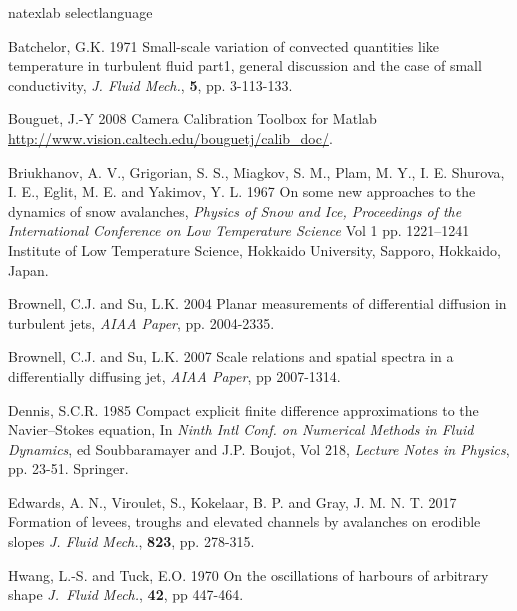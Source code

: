 \documentclass[lineno]{jfm}
\begin{document}
\begin{thebibliography}{99}

\expandafter\ifx\csname natexlab\endcsname\relax
\def\natexlab#1{#1}\fi
\expandafter\ifx\csname selectlanguage\endcsname\relax
\def\selectlanguage#1{\relax}\fi

{\sc Batchelor, G.K.} 1971 {Small-scale variation of convected quantities like temperature in turbulent fluid part1, general discussion and the case of small conductivity}, {\it J. Fluid Mech.}, {\bf 5}, pp. 3-113-133.

{\sc Bouguet, J.-Y} 2008 Camera Calibration Toolbox for Matlab {\url{http://www.vision.caltech.edu/bouguetj/calib_doc/}}.

{\sc Briukhanov, A. V.,   Grigorian, S. S., Miagkov,  S. M., Plam, M. Y.,   I. E. Shurova, I. E.,   Eglit, M. E. and Yakimov, Y. L.} 1967
{On some new approaches to the dynamics of snow avalanches},
{\it Physics of Snow and Ice,  Proceedings of the International Conference on Low Temperature Science}
{Vol 1} pp. 1221--1241 {Institute of Low Temperature Science, Hokkaido University, Sapporo, Hokkaido, Japan}.

 {\sc Brownell,  C.J.  and Su,  L.K.} 2004  {Planar measurements of differential diffusion in turbulent jets}, {\it AIAA Paper},  pp. 2004-2335.

  {\sc Brownell, C.J. and  Su, L.K.} 2007 {Scale relations and spatial spectra in a differentially diffusing jet}, {\it AIAA Paper}, pp 2007-1314.

 {\sc  Dennis, S.C.R.} 1985 {Compact explicit finite difference approximations to the Navier--Stokes equation},  { In \it Ninth Intl Conf. on Numerical Methods in Fluid Dynamics},  {ed Soubbaramayer and J.P. Boujot},  {Vol 218}, {\it Lecture Notes in Physics}, pp. 23-51. Springer.

{\sc Edwards, A. N., Viroulet, S., Kokelaar, B. P. and Gray, J. M. N. T.} 2017 Formation of levees, troughs and elevated channels by avalanches on erodible slopes {\it J. Fluid Mech.}, {\bf 823}, pp. 278-315.

 {\sc Hwang,  L.-S.  and  Tuck, E.O.} 1970 On the oscillations of harbours of arbitrary shape {\it J.~Fluid Mech.}, {\bf42}, pp 447-464.


\end{thebibliography}
\end{document}
